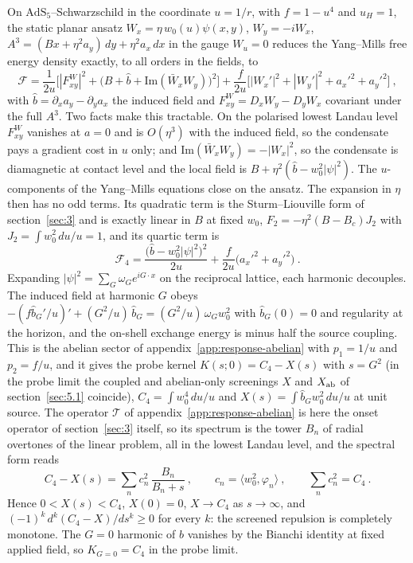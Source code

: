 On $\mathrm{AdS}_5$--Schwarzschild in the
coordinate $u = 1/r$, with $f = 1 - u^4$ and $u_H = 1$, the static planar
ansatz $W_x = \eta\,w_0(u)\psi(x,y)$, $W_y = -iW_x$,
$A^3 = (Bx + \eta^2 a_y)\,dy + \eta^2 a_x\,dx$ in the gauge
$W_u = 0$ reduces the Yang--Mills free energy density exactly, to all orders
in the fields, to
\begin{equation}
\mathcal{F} = \frac{1}{2u}\Big[|F^W_{xy}|^2 + \big(B + \hat b + \mathrm{Im}(\bar W_xW_y)\big)^2\Big] +
\frac{f}{2u}\Big[|W_x'|^2 + |W_y'|^2 + a_x'^2 + a_y'^2\Big]~,
\end{equation}
with $\hat b = \partial_xa_y - \partial_ya_x$ the induced field and $F^W_{xy} = D_xW_y - D_yW_x$
covariant under the full $A^3$. Two facts make this tractable. On the
polarised lowest Landau level $F^W_{xy}$ vanishes at $a = 0$ and is
$O(\eta^3)$ with the induced field, so the condensate pays a gradient
cost in $u$ only; and $\mathrm{Im}(\bar W_xW_y) = -|W_x|^2$, so the
condensate is diamagnetic at contact level and the local field is
$B + \eta^2(\hat b - w_0^2|\psi|^2)$. The $u$-components of the Yang--Mills
equations close on the ansatz. The expansion in $\eta$ then has no odd
terms. Its quadratic term is the Sturm--Liouville form of
section~\ref{sec:3} and is exactly linear in $B$ at fixed $w_0$,
$F_2 = -\eta^2(B - B_c)J_2$ with $J_2 = \int w_0^2\,du/u = 1$, and its
quartic term is
\begin{equation}
\mathcal{F}_4 = \frac{\big(\hat b - w_0^2|\psi|^2\big)^2}{2u} + \frac{f}{2u}\big(a_x'^2 + a_y'^2\big)~.
\end{equation}
Expanding $|\psi|^2 = \sum_G\omega_Ge^{iG\cdot x}$ on the reciprocal
lattice, each harmonic decouples. The induced field at harmonic $G$ obeys
$-(f\hat b_G'/u)' + (G^2/u)\,\hat b_G = (G^2/u)\,\omega_Gw_0^2$ with $\hat b_G(0) = 0$ and
regularity at the horizon, and the on-shell exchange energy is minus half
the source coupling. This is the abelian sector of appendix~\ref{app:response-abelian} with
$p_1 = 1/u$ and $p_2 = f/u$, and it gives the probe kernel
$K(s;0) = C_4 - X(s)$ with $s = G^2$ (in the probe limit the coupled and abelian-only screenings $X$ and $X_{\rm ab}$ of section~\ref{sec:5.1} coincide), $C_4 = \int w_0^4\,du/u$ and
$X(s) = \int \hat b_G w_0^2\,du/u$ at unit source. The operator $\mathcal{T}$ of
appendix~\ref{app:response-abelian} is here the onset operator of section~\ref{sec:3} itself, so its
spectrum is the tower $B_n$ of radial overtones of the linear problem, all in
the lowest Landau level, and the spectral
form reads
\begin{equation}
C_4 - X(s) = \sum_n c_n^2\,\frac{B_n}{B_n + s}~, \qquad c_n = \langle w_0^2,\varphi_n\rangle~, \qquad \sum_n c_n^2 = C_4~.
\end{equation}
Hence $0 < X(s) < C_4$, $X(0) = 0$, $X \to C_4$ as $s \to \infty$, and
$(-1)^k\,d^k(C_4 - X)/ds^k \ge 0$ for every $k$: the screened repulsion is
completely monotone. The $G = 0$ harmonic of $\hat b$ vanishes by the Bianchi
identity at fixed applied field, so $K_{G=0} = C_4$ in the probe limit.

